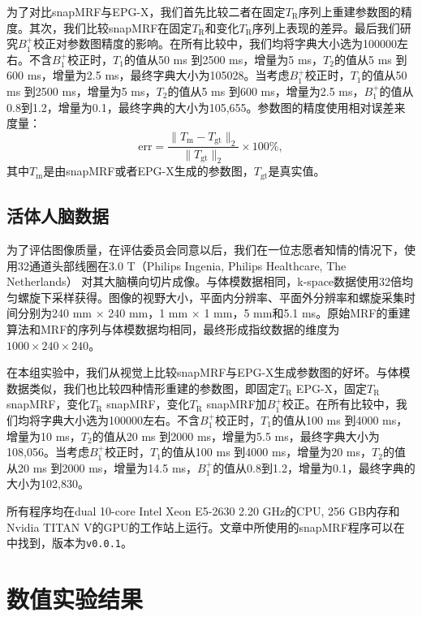 为了对比snapMRF与EPG-X，我们首先比较二者在固定$T_\mathrm{R}$序列上重建参数图的精度。其次，我们比较snapMRF在固定$T_\mathrm{R}$和变化$T_\mathrm{R}$序列上表现的差异。最后我们研究$B_1^+$校正对参数图精度的影响。在所有比较中，我们均将字典大小选为100000左右。不含$B_1^+$校正时，$T_1$的值从50 ms 到2500 ms，增量为5 ms，$T_2$的值从5 ms 到600 ms，增量为2.5 ms，最终字典大小为105028。当考虑$B_1^+$校正时，$T_1$的值从50 ms 到2500 ms，增量为5 ms，$T_2$的值从5 ms 到600 ms，增量为2.5 ms，$B_1^+$的值从0.8到1.2，增量为0.1，最终字典的大小为105,655。参数图的精度使用相对误差来度量：
\begin{equation}
	\mathrm{err} = \frac{\|T_\mathrm{m}-T_\mathrm{gt}\|_2}{\|T_\mathrm{gt}\|_2}\times 100\%,
\end{equation}
其中$T_\mathrm{m}$是由snapMRF或者EPG-X生成的参数图，$T_\mathrm{gt}$是真实值。

\subsection{活体人脑数据}
为了评估图像质量，在评估委员会同意以后，我们在一位志愿者知情的情况下，使用32通道头部线圈在3.0 T（Philips Ingenia, Philips Healthcare, The Netherlands） 对其大脑横向切片成像。与体模数据相同，k-space数据使用32倍均匀螺旋下采样获得\cite{pipe_spiral_2014}。图像的视野大小，平面内分辨率、平面外分辨率和螺旋采集时间分别为240 mm $\times$ 240 mm，1 mm $\times$ 1 mm，5 mm和5.1 ms。原始MRF的重建算法和MRF的序列与体模数据均相同，最终形成指纹数据的维度为$1000 \times 240 \times 240$。

在本组实验中，我们从视觉上比较snapMRF与EPG-X生成参数图的好坏。与体模数据类似，我们也比较四种情形重建的参数图，即固定$T_\mathrm{R}$ EPG-X，固定$T_\mathrm{R}$ snapMRF，变化$T_\mathrm{R}$ snapMRF，变化$T_\mathrm{R}$ snapMRF加$B_1^+$校正。在所有比较中，我们均将字典大小选为100000左右。不含$B_1^+$校正时，$T_1$的值从100 ms 到4000 ms，增量为10 ms，$T_2$的值从20 ms 到2000 ms，增量为5.5 ms，最终字典大小为108,056。当考虑$B_1^+$校正时，$T_1$的值从100 ms 到4000 ms，增量为20 ms，$T_2$的值从20 ms 到2000 ms，增量为14.5 ms，$B_1^+$的值从0.8到1.2，增量为0.1，最终字典的大小为102,830。

所有程序均在dual 10-core Intel Xeon E5-2630 2.20 GHz的CPU, 256 GB内存和Nvidia TITAN V的GPU的工作站上运行。文章中所使用的snapMRF程序可以在\cite{snapMRF}中找到，版本为\texttt{v0.0.1}。

\section{数值实验结果}
